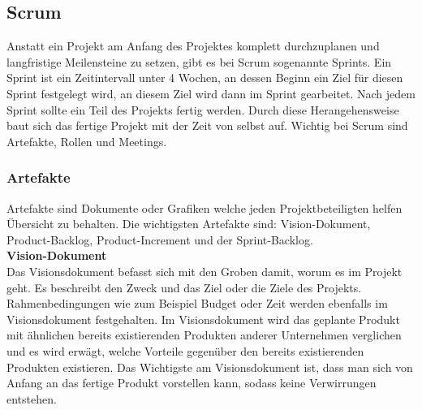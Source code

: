 	\subsection{Scrum}
	Anstatt ein Projekt am Anfang des Projektes komplett durchzuplanen und langfristige Meilensteine zu setzen, gibt es bei Scrum sogenannte Sprints. Ein Sprint ist ein Zeitintervall unter 4 Wochen, an dessen Beginn ein Ziel für diesen Sprint festgelegt wird, an diesem Ziel wird dann im Sprint gearbeitet. Nach jedem Sprint sollte ein Teil des Projekts fertig werden. Durch diese Herangehensweise baut sich das fertige Projekt mit der Zeit von selbst auf. Wichtig bei Scrum sind Artefakte, Rollen und Meetings.
	\subsubsection{Artefakte}
	\label{sec:Artefakte}
		Artefakte sind Dokumente oder Grafiken welche jeden Projektbeteiligten helfen Übersicht zu behalten. Die wichtigsten Artefakte sind: Vision-Dokument, Product-Backlog, Product-Increment und der Sprint-Backlog.\\
		
			\textbf{Vision-Dokument}\\
				Das Visionsdokument befasst sich mit den Groben damit, worum es im Projekt geht. Es beschreibt den Zweck und das Ziel oder die Ziele des Projekts. Rahmenbedingungen wie zum Beispiel Budget oder Zeit werden ebenfalls im Visionsdokument festgehalten. Im Visionsdokument wird das geplante Produkt mit ähnlichen bereits existierenden Produkten anderer Unternehmen verglichen und es wird erwägt, welche Vorteile gegenüber den bereits existierenden Produkten existieren.
			Das Wichtigste am Visionsdokument ist, dass man sich von Anfang an das fertige Produkt vorstellen kann, sodass keine Verwirrungen entstehen. \\ 
						
